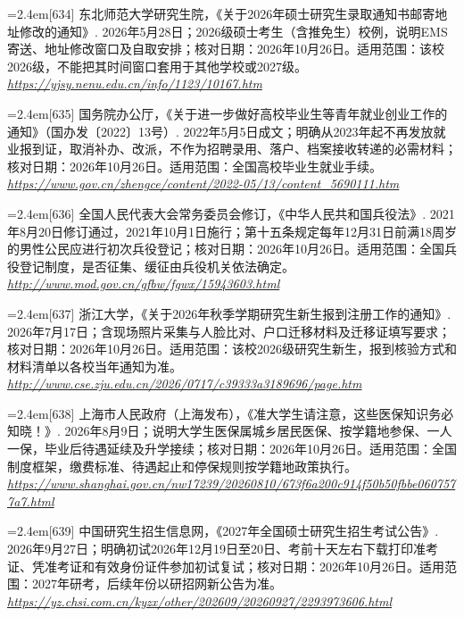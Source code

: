 \par\noindent\hangindent=2.4em\label{src:S0780}{\color{cAccent}[634]} 东北师范大学研究生院，《关于2026年硕士研究生录取通知书邮寄地址修改的通知》. 2026年5月28日；2026级硕士考生（含推免生）校例，说明EMS寄送、地址修改窗口及自取安排；核对日期：2026年10月26日。适用范围：该校2026级，不能把其时间窗口套用于其他学校或2027级。 \textit{\url{https://yjsy.nenu.edu.cn/info/1123/10167.htm}}\par
\par\noindent\hangindent=2.4em\label{src:S0781}{\color{cAccent}[635]} 国务院办公厅，《关于进一步做好高校毕业生等青年就业创业工作的通知》（国办发〔2022〕13号）. 2022年5月5日成文；明确从2023年起不再发放就业报到证，取消补办、改派，不作为招聘录用、落户、档案接收转递的必需材料；核对日期：2026年10月26日。适用范围：全国高校毕业生就业手续。 \textit{\url{https://www.gov.cn/zhengce/content/2022-05/13/content_5690111.htm}}\par
\par\noindent\hangindent=2.4em\label{src:S0782}{\color{cAccent}[636]} 全国人民代表大会常务委员会修订，《中华人民共和国兵役法》. 2021年8月20日修订通过，2021年10月1日施行；第十五条规定每年12月31日前满18周岁的男性公民应进行初次兵役登记；核对日期：2026年10月26日。适用范围：全国兵役登记制度，是否征集、缓征由兵役机关依法确定。 \textit{\url{http://www.mod.gov.cn/gfbw/fgwx/15943603.html}}\par
\par\noindent\hangindent=2.4em\label{src:S0783}{\color{cAccent}[637]} 浙江大学，《关于2026年秋季学期研究生新生报到注册工作的通知》. 2026年7月17日；含现场照片采集与人脸比对、户口迁移材料及迁移证填写要求；核对日期：2026年10月26日。适用范围：该校2026级研究生新生，报到核验方式和材料清单以各校当年通知为准。 \textit{\url{http://www.cse.zju.edu.cn/2026/0717/c39333a3189696/page.htm}}\par
\par\noindent\hangindent=2.4em\label{src:S0784}{\color{cAccent}[638]} 上海市人民政府（上海发布），《准大学生请注意，这些医保知识务必知晓！》. 2026年8月9日；说明大学生医保属城乡居民医保、按学籍地参保、一人一保，毕业后待遇延续及升学接续；核对日期：2026年10月26日。适用范围：全国制度框架，缴费标准、待遇起止和停保规则按学籍地政策执行。 \textit{\url{https://www.shanghai.gov.cn/nw17239/20260810/673f6a200c914f50b50fbbe0607577a7.html}}\par
\par\noindent\hangindent=2.4em\label{src:S0785}{\color{cAccent}[639]} 中国研究生招生信息网，《2027年全国硕士研究生招生考试公告》. 2026年9月27日；明确初试2026年12月19日至20日、考前十天左右下载打印准考证、凭准考证和有效身份证件参加初试复试；核对日期：2026年10月26日。适用范围：2027年研考，后续年份以研招网新公告为准。 \textit{\url{https://yz.chsi.com.cn/kyzx/other/202609/20260927/2293973606.html}}\par
